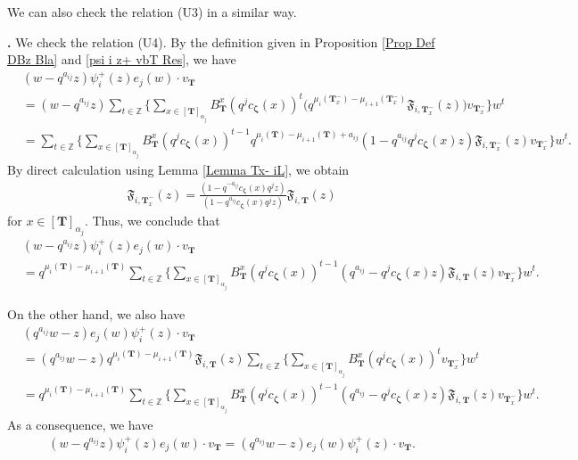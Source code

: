 \documentclass[12pt]{amsart}
\def \para{\refstepcounter{thm} \par\medskip\noindent
                \textbf{\thethm .} }
\numberwithin{equation}{thm}
\newcommand\ZZ{\mathbb Z}
\newcommand\bT{\mathbf T}
\newcommand\fF{\mathfrak F}
\renewcommand\a{\alpha}  %
\newcommand\Bz{\boldsymbol\zeta}
\newcounter{ni}
\begin{document}
We can also check the relation (U3) in a similar way.  

\para 
We check the relation (U4). 
By the definition given in Proposition \ref{Prop Def DBz Bla} and \eqref{psi i z+ vbT Res}, 
we have 
\begin{align*}
&(w- q^{a_{ij}} z) \psi_i^+ (z) e_j(w) \cdot v_{\bT} 
\\
&= (w- q^{a_{ij}} z) \sum_{t \in \ZZ} \Big\{ \sum_{x \in [\bT]_{\a_j}} B_{\bT}^x (q^j c_{\Bz} (x))^t  
	\big( q^{\mu_i( \bT_x^-) - \mu_{i+1} (\bT_x^-)} \fF_{i, \bT_x^-} (z) \big) v_{\bT_x^-} \Big\} w^t 
\\
&= \sum_{t \in \ZZ} \Big\{ \sum_{x \in [\bT]_{\a_j}} 
		B_{\bT}^x (q^j c_{\Bz}(x))^{t-1} 
		q^{\mu_i(\bT) - \mu_{i+1} (\bT) + a_{ij}} (1 - q^{a_{ij}} q^j c_{\Bz} (x) z) \fF_{i,\bT_x^-}(z) v_{\bT_x^-} \Big\} w^t.  
\end{align*}
By direct calculation using Lemma \ref{Lemma Tx- iL}, we obtain 
\begin{align*}
\fF_{i,\bT_x^-}(z)= \frac{( 1 - q^{-a_{ij}} c_{\Bz} (x) q^j z)}{(1 - q^{a_{ij}} c_{\Bz} (x) q^j z)} \fF_{i, \bT}(z) 
\end{align*}
for $x \in [\bT]_{\a_j}$. Thus, we conclude that 
\begin{align*}
&(w- q^{a_{ij}} z) \psi_i^+ (z) e_j(w) \cdot v_{\bT} 
\\
&= q^{\mu_i(\bT) - \mu_{i+1} (\bT)} \sum_{t \in \ZZ} \Big\{ \sum_{x \in [\bT]_{\a_j}} B_{\bT}^x (q^j c_{\Bz} (x))^{t-1} 
	(q^{a_{ij}} - q^j c_{\Bz}(x) z) \fF_{i,\bT} (z) v_{\bT_x^-}\Big\} w^t.
\end{align*}


On the other hand, we also have 
\begin{align*}
&(q^{a_{ij}} w - z) e_j(w) \psi_i^+(z) \cdot v_{\bT} 
\\
&= (q^{a_{ij}} w - z) q^{\mu_i(\bT) - \mu_{i+1}(\bT)} \fF_{i,\bT} (z) 
	\sum_{t \in \ZZ} \Big\{ \sum_{x \in [\bT]_{\a_j}} B_{\bT}^x (q^j c_{\Bz} (x))^t v_{\bT_x^-} \Big\} w^t 
\\
&= q^{\mu_i(\bT) - \mu_{i+1} (\bT)} \sum_{t \in \ZZ} \Big\{ \sum_{x \in [\bT]_{\a_j}} B_{\bT}^x (q^j c_{\Bz} (x))^{t-1} 
	(q^{a_{ij}} - q^j c_{\Bz}(x) z) \fF_{i,\bT} (z) v_{\bT_x^-}\Big\} w^t.
\end{align*}
As a consequence, we have  
\begin{align*} 
(w- q^{a_{ij}} z) \psi_i^+ (z) e_j(w) \cdot v_{\bT}  = (q^{a_{ij}} w - z) e_j(w) \psi_i^+(z) \cdot v_{\bT}. 
\end{align*} 
\end{document}
